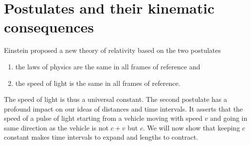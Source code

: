 \section{Postulates and their kinematic consequences}\label{c1s2}
Einstein proposed a new theory of relativity based on the two postulates
\begin{enumerate}
\item the laws of physics are the same in all frames of reference and 
\item the speed of light is the same in all frames of reference.
\end{enumerate}
The speed of light is thus a universal constant. The second postulate has a 
profound impact on our ideas of distances and time intervals. It asserts that
the speed of a pulse of light starting from a vehicle moving with speed $v$
and going in same direction as the vehicle is not $c + v$ but $c$. We will now
show that keeping $c$ constant makes time intervals to expand and lengths to 
contract.

